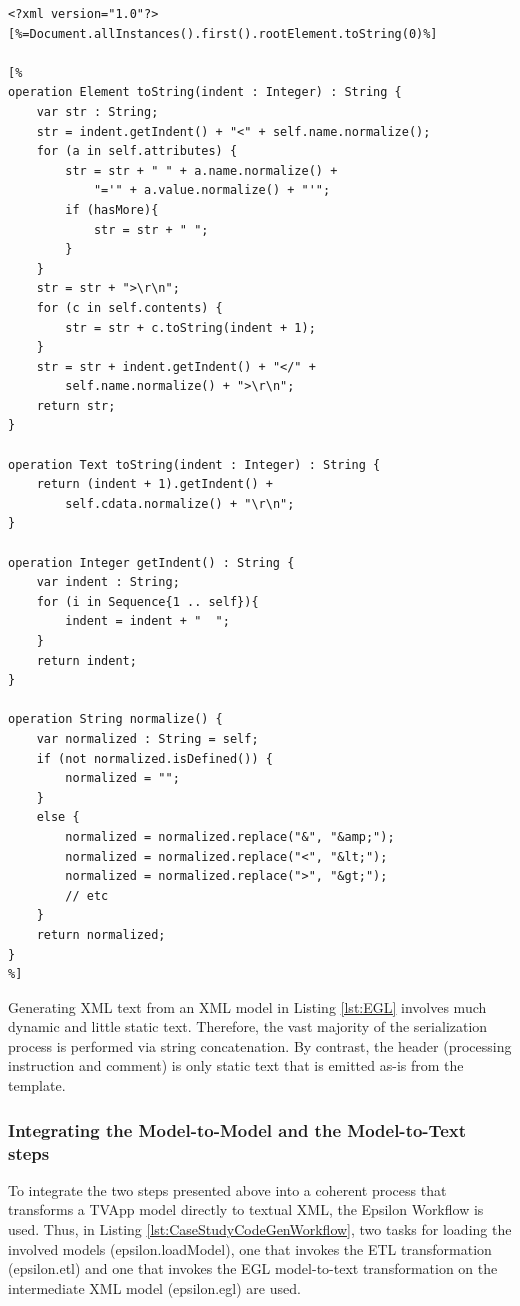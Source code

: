 \begin{lstlisting}[basicstyle=\ttfamily\footnotesize, nolol=true, flexiblecolumns=true, caption=EGL template that generates XML text from XML models, tabsize=2, label=lst:EGL, language=EOL]
<?xml version="1.0"?>
[%=Document.allInstances().first().rootElement.toString(0)%]

[%
operation Element toString(indent : Integer) : String {
	var str : String;
	str = indent.getIndent() + "<" + self.name.normalize();
	for (a in self.attributes) {
		str = str + " " + a.name.normalize() + 
			"='" + a.value.normalize() + "'";
		if (hasMore){
			str = str + " ";
		}
	}
	str = str + ">\r\n";
	for (c in self.contents) {
		str = str + c.toString(indent + 1);
	}
	str = str + indent.getIndent() + "</" + 
		self.name.normalize() + ">\r\n";
	return str;
}

operation Text toString(indent : Integer) : String {
	return (indent + 1).getIndent() + 
		self.cdata.normalize() + "\r\n";
}

operation Integer getIndent() : String {
	var indent : String;
	for (i in Sequence{1 .. self}){
		indent = indent + "  ";
	}
	return indent;
}

operation String normalize() {
	var normalized : String = self;
	if (not normalized.isDefined()) { 
		normalized = "";
	}
	else {
		normalized = normalized.replace("&", "&amp;");
		normalized = normalized.replace("<", "&lt;");
		normalized = normalized.replace(">", "&gt;");
		// etc
	}
	return normalized;
}
%]
\end{lstlisting}

Generating XML text from an XML model in Listing \ref{lst:EGL} involves much dynamic and little static text. Therefore, the vast majority of the serialization process is performed via string concatenation. By contrast, the header (processing instruction and comment) is only static text that is emitted as-is from the template.

\subsubsection{Integrating the Model-to-Model and the Model-to-Text steps}

To integrate the two steps presented above into a coherent process that transforms a TVApp model directly to textual XML, the Epsilon Workflow is used. Thus, in Listing \ref{lst:CaseStudyCodeGenWorkflow}, two tasks for loading the involved models (epsilon.loadModel), one that invokes the ETL transformation (epsilon.etl) and one that invokes the EGL model-to-text transformation on the intermediate XML model (epsilon.egl) are used.

